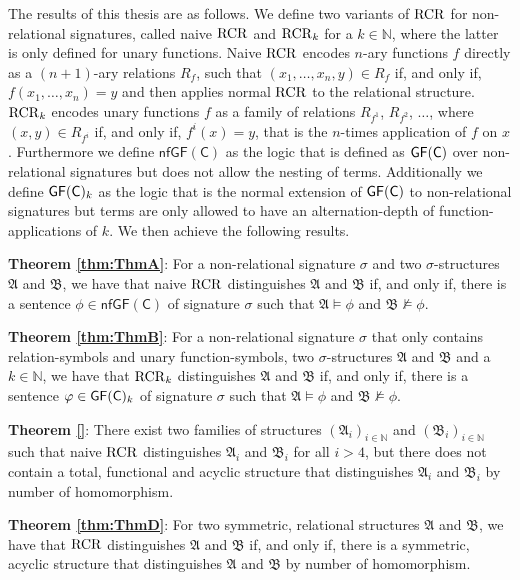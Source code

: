 The results of this thesis are as follows.
We define two variants of $\operatorname{RCR}$ for non-relational signatures, called naive $\operatorname{RCR}$ and $\operatorname{RCR}_k$ for a $k\in\mathbb{N}$, where the latter is only defined for unary functions.
Naive $\operatorname{RCR}$ encodes $n$-ary functions $f$ directly as a $(n+1)$-ary relations $R_f$, such that $(x_1,\dots,x_n,y)\in R_f$ if, and only if, $f(x_1,\dots,x_n)=y$ and then applies normal $\operatorname{RCR}$ to the relational structure.
$\operatorname{RCR}_k$ encodes unary functions $f$ as a family of relations $R_{f^1}$, $R_{f^2}$, $\dots$, where $(x,y)\in R_{f^i}$ if, and only if, $f^i(x)=y$, that is the $n$-times application of $f$ on $x$.
Furthermore we define $\mathsf{nfGF}(\mathsf C)$ as the logic that is defined as $\mathsf{GF}(\mathsf{C})$ over non-relational signatures but does not allow the nesting of terms. 
Additionally we define $\mathsf{GF}(\mathsf{C})_k$ as the logic that is the normal extension of $\mathsf{GF}(\mathsf{C})$ to non-relational signatures but terms are only allowed to have an alternation-depth of function-applications of $k$.
We then achieve the following results.

\textbf{Theorem \ref{thm:ThmA}}:
For a non-relational signature $\sigma$ and two $\sigma$-structures $\mathfrak A$ and $\mathfrak B$, we have that naive $\operatorname{RCR}$ distinguishes $\mathfrak A$ and $\mathfrak B$ if, and only if, there is a sentence $\phi\in \mathsf{nfGF}(\mathsf C)$ of signature $\sigma$ such that $\mathfrak A\models \phi$ and $\mathfrak B\not\models \phi$.

\textbf{Theorem \ref{thm:ThmB}}:
For a non-relational signature $\sigma$ that only contains relation-symbols and unary function-symbols, two $\sigma$-structures $\mathfrak A$ and $\mathfrak B$ and a $k\in\mathbb N$, we have that $\operatorname{RCR}_k$ distinguishes $\mathfrak A$ and $\mathfrak B$ if, and only if, there is a sentence $\varphi\in \mathsf{GF}(\mathsf{C})_k$ of signature $\sigma$ such that $\mathfrak A\models \phi$ and $\mathfrak B\not\models \phi$.

\textbf{Theorem \ref{}}:
There exist two families of structures $(\mathfrak A_i)_{i\in\mathbb N}$ and $(\mathfrak B_i)_{i\in\mathbb N}$ such that naive $\operatorname{RCR}$ distinguishes $\mathfrak A_i$ and $\mathfrak B_i$ for all $i>4$, but there does not contain a total, functional and acyclic structure that distinguishes $\mathfrak A_i$ and $\mathfrak B_i$ by number of homomorphism. 

\textbf{Theorem \ref{thm:ThmD}}:
For two symmetric, relational structures $\mathfrak A$ and $\mathfrak B$, we have that $\operatorname{RCR}$ distinguishes $\mathfrak A$ and $\mathfrak B$ if, and only if, there is a symmetric, acyclic structure that distinguishes $\mathfrak A$ and $\mathfrak B$ by number of homomorphism.

